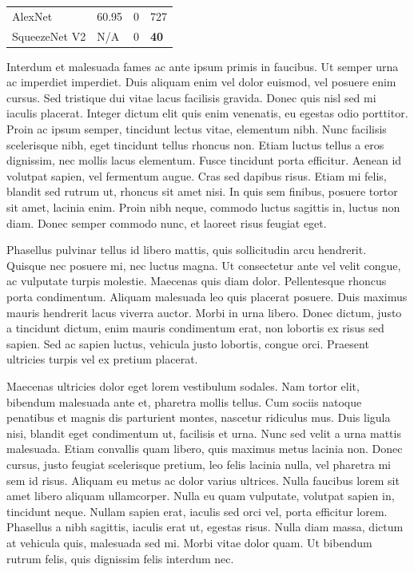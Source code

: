 \begin{table}[h]
\begin{tabular}{@{}llll@{}}
AlexNet       & 60.95                                                                           & 0                                                                                 & 727                                                                           \\
SqueezeNet V2 & {\color[HTML]{000000} N/A}                                                      & 0                                                                                 & {\color[HTML]{CB0000} \textbf{40}}                                            \\ \bottomrule
\end{tabular}
\end{table}

Interdum et malesuada fames ac ante ipsum primis in faucibus. Ut semper urna ac imperdiet imperdiet. Duis aliquam enim vel dolor euismod, vel posuere enim cursus. Sed tristique dui vitae lacus facilisis gravida. Donec quis nisl sed mi iaculis placerat. Integer dictum elit quis enim venenatis, eu egestas odio porttitor. Proin ac ipsum semper, tincidunt lectus vitae, elementum nibh. Nunc facilisis scelerisque nibh, eget tincidunt tellus rhoncus non. Etiam luctus tellus a eros dignissim, nec mollis lacus elementum. Fusce tincidunt porta efficitur. Aenean id volutpat sapien, vel fermentum augue. Cras sed dapibus risus. Etiam mi felis, blandit sed rutrum ut, rhoncus sit amet nisi. In quis sem finibus, posuere tortor sit amet, lacinia enim. Proin nibh neque, commodo luctus sagittis in, luctus non diam. Donec semper commodo nunc, et laoreet risus feugiat eget.

Phasellus pulvinar tellus id libero mattis, quis sollicitudin arcu hendrerit. Quisque nec posuere mi, nec luctus magna. Ut consectetur ante vel velit congue, ac vulputate turpis molestie. Maecenas quis diam dolor. Pellentesque rhoncus porta condimentum. Aliquam malesuada leo quis placerat posuere. Duis maximus mauris hendrerit lacus viverra auctor. Morbi in urna libero. Donec dictum, justo a tincidunt dictum, enim mauris condimentum erat, non lobortis ex risus sed sapien. Sed ac sapien luctus, vehicula justo lobortis, congue orci. Praesent ultricies turpis vel ex pretium placerat.

Maecenas ultricies dolor eget lorem vestibulum sodales. Nam tortor elit, bibendum malesuada ante et, pharetra mollis tellus. Cum sociis natoque penatibus et magnis dis parturient montes, nascetur ridiculus mus. Duis ligula nisi, blandit eget condimentum ut, facilisis et urna. Nunc sed velit a urna mattis malesuada. Etiam convallis quam libero, quis maximus metus lacinia non. Donec cursus, justo feugiat scelerisque pretium, leo felis lacinia nulla, vel pharetra mi sem id risus. Aliquam eu metus ac dolor varius ultrices. Nulla faucibus lorem sit amet libero aliquam ullamcorper. Nulla eu quam vulputate, volutpat sapien in, tincidunt neque. Nullam sapien erat, iaculis sed orci vel, porta efficitur lorem. Phasellus a nibh sagittis, iaculis erat ut, egestas risus. Nulla diam massa, dictum at vehicula quis, malesuada sed mi. Morbi vitae dolor quam. Ut bibendum rutrum felis, quis dignissim felis interdum nec.

